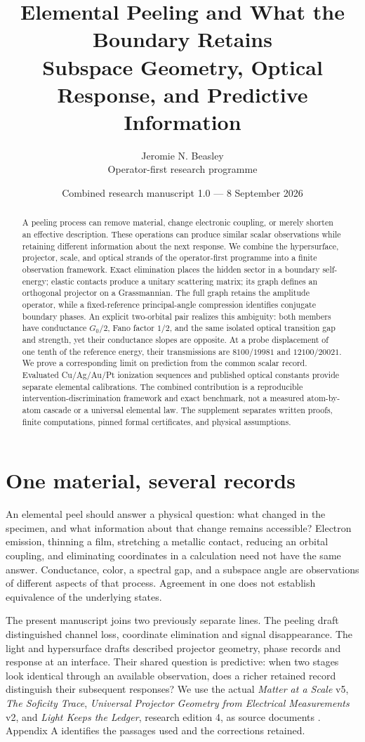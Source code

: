 \documentclass[11pt]{article}
\title{Elemental Peeling and What the Boundary Retains\\[4pt]\large Subspace Geometry, Optical Response, and Predictive Information}
\author{Jeromie N. Beasley\\\small Operator-first research programme}
\date{Combined research manuscript 1.0 --- 8 September 2026}
\begin{document}
\maketitle
\begin{abstract}
A peeling process can remove material, change electronic coupling, or merely shorten an effective description. These operations can produce similar scalar observations while retaining different information about the next response. We combine the hypersurface, projector, scale, and optical strands of the operator-first programme into a finite observation framework. Exact elimination places the hidden sector in a boundary self-energy; elastic contacts produce a unitary scattering matrix; its graph defines an orthogonal projector on a Grassmannian. The full graph retains the amplitude operator, while a fixed-reference principal-angle compression identifies conjugate boundary phases. An explicit two-orbital pair realizes this ambiguity: both members have conductance $G_0/2$, Fano factor $1/2$, and the same isolated optical transition gap and strength, yet their conductance slopes are opposite. At a probe displacement of one tenth of the reference energy, their transmissions are $8100/19981$ and $12100/20021$. We prove a corresponding limit on prediction from the common scalar record. Evaluated Cu/Ag/Au/Pt ionization sequences and published optical constants provide separate elemental calibrations. The combined contribution is a reproducible intervention-discrimination framework and exact benchmark, not a measured atom-by-atom cascade or a universal elemental law. The supplement separates written proofs, finite computations, pinned formal certificates, and physical assumptions.
\end{abstract}

\section{One material, several records}
An elemental peel should answer a physical question: what changed in the specimen, and what information about that change remains accessible? Electron emission, thinning a film, stretching a metallic contact, reducing an orbital coupling, and eliminating coordinates in a calculation need not have the same answer. Conductance, color, a spectral gap, and a subspace angle are observations of different aspects of that process. Agreement in one does not establish equivalence of the underlying states.

The present manuscript joins two previously separate lines. The peeling draft distinguished channel loss, coordinate elimination and signal disappearance. The light and hypersurface drafts described projector geometry, phase records and response at an interface. Their shared question is predictive: when two stages look identical through an available observation, does a richer retained record distinguish their subsequent responses? We use the actual \emph{Matter at a Scale} v5, \emph{The Soficity Trace}, \emph{Universal Projector Geometry from Electrical Measurements} v2, and \emph{Light Keeps the Ledger}, research edition 4, as source documents \cite{matter,sofic,upg,light}. Appendix A identifies the passages used and the corrections retained.
\end{document}

